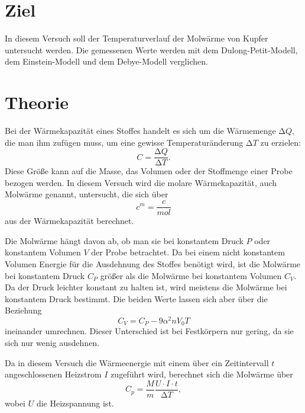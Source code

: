 \section{Ziel}
\label{sec:Ziel}
In diesem Versuch soll der Temperaturverlauf der Molwärme von 
Kupfer untersucht werden. Die gemessenen Werte werden mit dem 
Dulong-Petit-Modell, dem Einstein-Modell und dem Debye-Modell 
verglichen.

\section{Theorie}
\label{sec:Theorie}
Bei der Wärmekapazität eines Stoffes handelt es sich um die Wärmemenge $\increment Q$, die 
man ihm zufügen muss, um eine gewisse Temperaturänderung $\increment T$ zu erzielen:
\begin{equation*}
    C = \frac{\increment Q}{\increment T}.
\end{equation*}
Diese Größe kann auf die Masse, das Volumen oder der Stoffmenge einer Probe bezogen werden. 
In diesem Versuch wird die molare Wärmekapazität, auch Molwärme genannt, untersucht, die sich über 
\begin{equation*}
    c^{\si{m}} = \frac{c}{\si{mol}}
\end{equation*}
aus der Wärmekapazität berechnet. 

Die Molwärme hängt davon ab, ob man sie bei konstantem Druck $P$ oder konstantem Volumen $V$ der Probe betrachtet. Da bei einem nicht konstantem Volumen 
Energie für die Ausdehnung des Stoffes benötigt wird, ist die Molwärme bei konstantem Druck $C_{\si{P}}$ größer als die Molwärme bei konstantem Volumen $C_{\si{V}}$. 
Da der Druck leichter konstant zu halten ist, wird meistens die Molwärme bei konstantem Druck bestimmt. 
Die beiden Werte lassen sich aber über die Beziehung 
\begin{equation}
    \label{eqn:cv}
    C_{\si{V}}=C_{\si{P}}-9\alpha ^2 n  V_0 T
\end{equation}
ineinander umrechnen. Dieser Unterschied ist bei Festkörpern nur gering, da sie sich nur wenig ausdehnen.

Da in diesem Versuch die Wärmeenergie mit einem über ein Zeitintervall $t$ angeschlossenen Heizstrom $I$ zugeführt wird, 
berechnet sich die Molwärme über
\begin{equation}
    \label{eqn:cp}
    C_{\si{p}} = \frac{M}{m} \frac{U\cdot I \cdot t}{\increment T},
\end{equation}
wobei $U$ die Heizspannung ist.
\\


